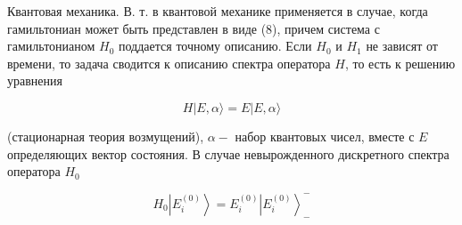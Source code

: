\documentclass[10pt]{article}
\begin{document}
Квантовая механика. В. т. в квантовой механике применяется в случае, когда гамильтониан может быть представлен в виде (8), причем система с гамильтонианом $H_{0}$ поддается точному описанию. Если $H_{0}$ и $H_{1}$ не зависят от времени, то задача сводится к описанию спектра оператора $H$, то есть к решению уравнения



\[

H|E, \alpha\rangle=E|E, \alpha\rangle

\]



(стационарная теория возмущений), $\alpha-$ набор квантовых чисел, вместе с $E$ определяющих вектор состояния. В случае невырожденного дискретного спектра оператора $H_{0}$



\[

H_{0}\left|E_{i}^{(0)}\right\rangle=E_{i}^{(0)}\left|E_{i}^{(0)}\right\rangle_{-}^{-}

\]
\end{document}

